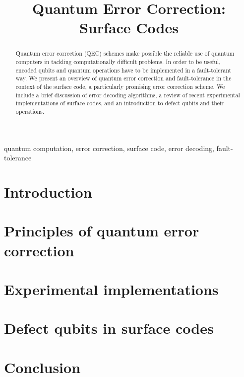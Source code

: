 \documentclass[conference]{IEEEtran}
\begin{document}
\title{Quantum Error Correction: Surface Codes}

\author{

  \and

}

\maketitle


\begin{abstract}
  Quantum error correction (QEC) schemes make possible the reliable use of
  quantum computers in tackling computationally difficult problems. In order to
  be useful, encoded qubits and quantum operations have to be implemented in a
  fault-tolerant way. We present an overview of quantum error correction and
  fault-tolerance in the context of the surface code, a particularly promising
  error correction scheme. We include a brief discussion of error decoding
  algorithms, a review of recent experimental implementations of surface
  codes, and an introduction to defect qubits and their operations.
\end{abstract}

\begin{IEEEkeywords}
  quantum computation, error correction, surface code, error decoding,
  fault-tolerance
\end{IEEEkeywords}

\section{Introduction}


\section{Principles of quantum error correction}


\section{Experimental implementations}


\section{Defect qubits in surface codes}


\section{Conclusion}


\pagebreak
\printbibliography
\end{document}
